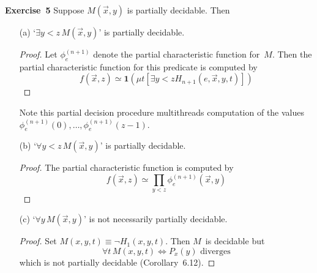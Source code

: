 \documentclass[letterpaper]{article}
\newcommand{\exercise}[2][]{\noindent\textbf{Exercise~{#2}}\ifthenelse{\isempty{#1}}{\textbf{.}}{ ({#1})\textbf{.}}}
\theoremstyle{plain}
\theoremstyle{definition}
\theoremstyle{remark}
\begin{document}
\bigskip
\exercise{5}
Suppose $M(\vec{x},y)$ is partially decidable. Then
\begin{enumerate}[itemsep=0pt]
\item[(a)] `$\exists y<z\,M(\vec{x},y)$' is partially decidable.
\begin{proof}
Let $\phi_e^{(n+1)}$ denote the partial characteristic function for~$M$. Then the partial characteristic function for this predicate is computed by
$$f(\vec{x},z)\simeq\mathbf{1}(\mu t[\exists y<z H_{n+1}(e,\vec{x},y,t)])$$
\end{proof}
\noindent Note this partial decision procedure multithreads computation of the values $\phi_e^{(n+1)}(0),\ldots,\phi_e^{(n+1)}(z-1)$.
\item[(b)] `$\forall y<z\,M(\vec{x},y)$' is partially decidable.
\begin{proof}
The partial characteristic function is computed by
$$f(\vec{x},z)\simeq\prod_{y<z}\phi_e^{(n+1)}(\vec{x},y)$$
\end{proof}
\item[(c)] `$\forall y\,M(\vec{x},y)$' is not necessarily partially decidable.
\begin{proof}
Set $M(x,y,t)\equiv\lnot H_1(x,y,t)$. Then $M$~is decidable but
$$\forall t\,M(x,y,t)\iff P_x(y)\text{ diverges}$$
which is not partially decidable (Corollary~6.12).
\end{proof}
\end{enumerate}
\end{document}
